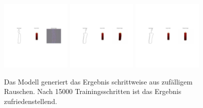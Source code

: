 \begin{figure}[h]
	\centering
	\includegraphics[width=0.3\textwidth]{bilder/0.jpg}
	\includegraphics[width=0.3\textwidth]{bilder/1.jpg}
	\includegraphics[width=0.3\textwidth]{bilder/15.jpg}
	\caption[Verschiedene Trainingsschritte]{Das Modell generiert das Ergebnis schrittweise aus zufälligem Rauschen. Nach 15000 Trainingsschritten ist das Ergebnis zufriedenstellend.}
	\label{fig:trichter}
\end{figure}



